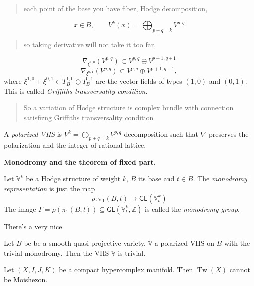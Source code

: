 \begin{quote}
each point of the base you have fiber, Hodge
decomposition,
\end{quote}
$$
x\in B, \qquad
V^k(x)=\bigoplus_{p+q=k}V^{p,q}
$$
\begin{quote}
so taking derivative will not take it too
far,
\end{quote}
$$
\nabla_{\xi^{1,0}}(V^{p,q} )\subset V^{p,q}
\oplus V^{p-1,q+1}
$$
$$
\nabla_{\xi^{0,1} }(V^{p,q} )\subset
V^{p,q}\oplus V^{p+1,q-1},
$$
where $\xi^{1,0}+\xi^{0,1} \in
T^{1,0}_B\oplus T^{0,1}_B$ are the vector
fields of types $(1,0)$ and $(0,1)$. This is
called {\it Griffiths transversality
condition}.

\begin{quote}
So a variation of Hodge structure is complex
bundle with connection satisfizng Griffiths
transversality condition
\end{quote}

\begin{definition}
\label{definition-tw-polarized-vhs}
A {\it polarized VHS} is
$V^k=\bigoplus_{p+q=k}V^{p,q}$ decomposition
such that $\nabla$ preserves the polarization
and the integer of rational lattice.
\end{definition}

\medskip\noindent
{\bf Monodromy and the theorem of fixed
part.}

\begin{definition}
\label{definition-tw-monodromy}
Let $\mathbb{V}^k$ be a Hodge structure of
weight $k$, $B$ its base and $t\in B$. The
{\it monodromy representation} is just the
map
$$
\rho:\pi_{1}(B,t) \to
\mathsf{GL}(\mathbb{V}^k_t)
$$
The image $\Gamma=\rho(\pi_{1}(B,t)
)\subseteq
\mathsf{GL}(\mathbb{V}^k_t,\mathbb{Z})$ is
called the {\it monodromy group}.
\end{definition}

There's a very nice

\begin{theorem}[Deligne]
\label{theorem-tw-deligne}
Let $B$ be be a smooth quasi projective
variety, $\mathbb{V}$ a polarized VHS on $B$
with the trivial monodromy. Then the VHS
$\mathbb{V}$ is trivial.
\end{theorem}

\begin{theorem}
\label{theorem-tw-main}
Let $(X,I,J,K)$ be a compact hypercomplex
manifold. Then $\operatorname{Tw}(X)$ cannot
be Moishezon.
\end{theorem}

